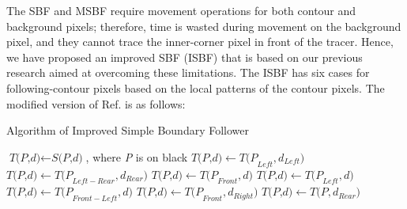 The SBF and MSBF require movement operations for both contour and background pixels; therefore, time is wasted during movement on the background pixel, and they cannot trace the inner-corner pixel in front of the tracer\cite{Cheong2006Improved,Ghuneim2015Contour}. Hence, we have proposed an improved SBF (ISBF)\cite{Cheong2006Improved} that is based on our previous research aimed at overcoming these limitations. The ISBF has six cases for following-contour pixels based on the local patterns of the contour pixels. The modified version of Ref. \cite{Cheong2012Advanced} is as follows: 

\begin{algorithm}
	\caption{Algorithm of Improved Simple Boundary Follower}\label{alg:isbf}
	\begin{algorithmic}[1]
	\State $\textit{T(P,d)} \gets \textit{S(P,d)}$, where \textit{P} is on black
	\Do
		\State $\textit{T(P,d)} \gets \textit{T(P}_{Left},\textit{d}_{Left} )  $
	\Else
			\State $\textit{T(P,d)} \gets \textit{T(P}_{Left-Rear},\textit{d}_{Rear} )  $
		\Else
					\State $\textit{T(P,d)} \gets \textit{T(P}_{Front},\textit{d} )  $
					\State $\textit{T(P,d)} \gets \textit{T(P}_{Left}, \textit{d})$
				\Else
					\State $\textit{T(P,d)} \gets \textit{T(P}_{Front-Left},\textit{d} )  $
				\EndIf
				\State $\textit{T(P,d)} \gets \textit{T(P}_{Front},\textit{d}_{Right} )  $
			\Else
				\State $\textit{T(P,d)} \gets \textit{T(P},\textit{d}_{Rear} )  $
			\EndIf
		\EndIf
	\EndIf
	\EndProcedure
	\end{algorithmic}
\end{algorithm}


